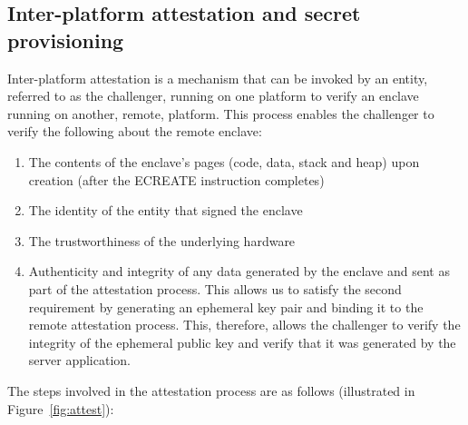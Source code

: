 \documentclass[../main.tex]{subfiles}
\begin{document}
\subsection{Inter-platform attestation and secret provisioning}
Inter-platform attestation is a mechanism that can be invoked by an entity, referred to as the challenger, running on one platform
to verify an enclave running on another, remote, platform. This process enables the challenger to verify the following about the remote enclave:
\begin{enumerate}
	\item The contents of the enclave's pages (code, data, stack and heap) upon creation (after the ECREATE instruction completes)
	\item The identity of the entity that signed the enclave 
	\item The trustworthiness of the underlying hardware
	\item Authenticity and integrity of any data generated by the enclave and sent as part of the attestation process. This allows us to satisfy the second requirement by generating an ephemeral key
	      pair and binding it to the remote attestation process. This, therefore, allows the challenger to verify the integrity of the ephemeral public key and verify that it was generated by the server application.
\end{enumerate}
The steps involved in the attestation process are as follows (illustrated in Figure~\ref{fig:attest}):
\end{document}
